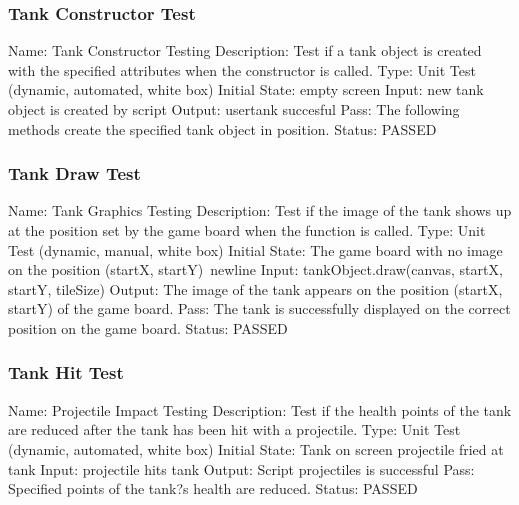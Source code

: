\documentclass{article}
\begin{document}
\subsubsection{Tank Constructor Test}
\label{sec:3.2.13}
Name: Tank Constructor Testing\newline
Description: Test if a tank object is created with the specified attributes 
when the constructor is called.\newline
Type: Unit Test (dynamic, automated, white box)\newline
Initial State: empty screen\newline
Input: new tank object is created by script\newline
Output: usertank succesful \newline
Pass: The following methods create the specified tank object in position.
\newline
\newline Status: PASSED

\subsubsection{Tank Draw Test}
\label{sec:3.2.14}
Name: Tank Graphics Testing\newline
Description: Test if the image of the tank shows up at the position set by the 
game board when the function is called.\newline
Type: Unit Test (dynamic, manual, white box)\newline
Initial State: The game board with no image on the position (startX, startY)
Input: tankObject.draw(canvas, startX, startY, tileSize)\newline
Output: The image of the tank appears on the position (startX, startY) of the 
game board.\newline
Pass: The tank is successfully displayed on the correct position on the game 
board.\newline
\newline Status: PASSED

\subsubsection{Tank Hit Test}
\label{sec:3.2.15}
Name: Projectile Impact Testing\newline
Description: Test if the health points of the tank are reduced after the tank 
has been hit with a projectile.\newline
Type: Unit Test (dynamic, automated, white box)\newline
Initial State: Tank on screen projectile fried at tank\newline
Input: projectile hits tank\newline
Output: Script projectiles is successful  \newline
Pass: Specified points of the tank?s health are reduced.\newline
\newline Status: PASSED
\end{document}
